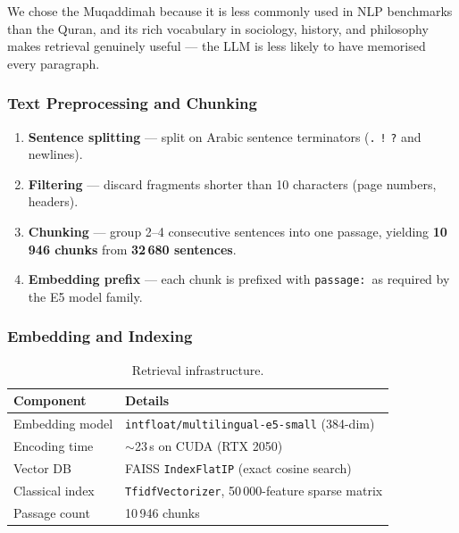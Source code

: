 \documentclass[12pt, a4paper]{article}
\renewcommand{\arraystretch}{1.12}
\begin{document}
We chose the Muqaddimah because it is less commonly used in NLP benchmarks
than the Quran, and its rich vocabulary in sociology, history, and philosophy
makes retrieval genuinely useful --- the LLM is less likely to have memorised
every paragraph.

\subsubsection{Text Preprocessing and Chunking}

\begin{enumerate}
    \item \textbf{Sentence splitting} --- split on Arabic sentence terminators
          (\texttt{.} \texttt{!} \texttt{?} and newlines).
    \item \textbf{Filtering} --- discard fragments shorter than 10 characters
          (page numbers, headers).
    \item \textbf{Chunking} --- group 2--4 consecutive sentences into one passage,
          yielding \textbf{10\,946 chunks} from \textbf{32\,680 sentences}.
    \item \textbf{Embedding prefix} --- each chunk is prefixed with
          \texttt{passage:}\ as required by the E5 model family.
\end{enumerate}

\subsubsection{Embedding and Indexing}

\begin{table}[H]
\centering
\renewcommand{\arraystretch}{1.3}
\begin{tabular}{l l}
\toprule
\textbf{Component} & \textbf{Details} \\
\midrule
Embedding model    & \texttt{intfloat/multilingual-e5-small} (384-dim) \\
Encoding time      & $\sim$23\,s on CUDA (RTX 2050) \\
Vector DB          & FAISS \texttt{IndexFlatIP} (exact cosine search) \\
Classical index    & \texttt{TfidfVectorizer}, 50\,000-feature sparse matrix \\
Passage count      & 10\,946 chunks \\
\bottomrule
\end{tabular}
\caption{Retrieval infrastructure.}
\label{tab:p4_index}
\end{table}
\end{document}
